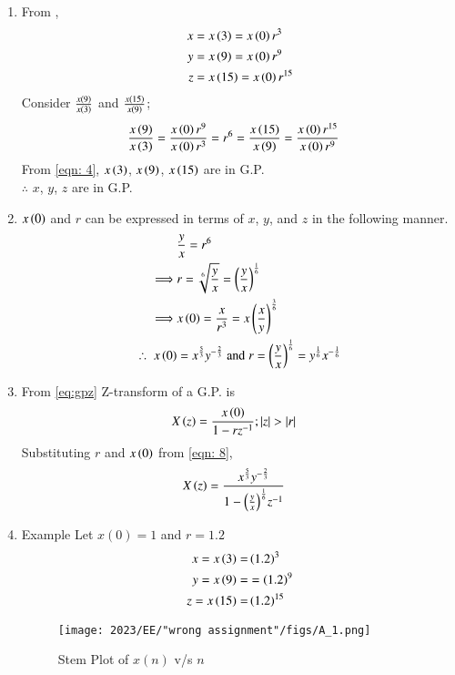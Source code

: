 \documentclass[journal,12pt,twocolumn]{IEEEtran}
\theoremstyle{remark}
\begin{document}
\begin{enumerate}
\item From ,
\begin{align}
    x&= x\left(3\right) =x\left(0\right)r^3 \\
	y&=x\left(9\right)=x\left(0\right)r^{9} \\
	z&=x\left(15\right)=x\left(0\right)r^{15}
\end{align}
Consider $\frac{x\left(9\right)}{x\left(3\right)}$ and $\frac{x\left(15\right)}{x\left(9\right)}$;
\begin{align}
	\frac{x\left(9\right)}{x\left(3\right)} &= \frac{x\left(0\right)r^{9}}{x\left(0\right)r^3} = r^6 = \frac{x\left(15\right)}{x\left(9\right)} = \frac{x\left(0\right)r^{15}}{x\left(0\right)r^{9}}\label{eqn: 4}
\end{align}
From \eqref{eqn: 4}, $x\left(3\right)$, $x\left(9\right)$, $x\left(15\right)$ are in G.P.\\
$\therefore$  $x$, $y$, $z$ are in G.P.\\

\item
$x\left(0\right)$ and $r$ can be expressed in terms of $x$, $y$, and $z$ in the following manner.
\begin{align}
    &\frac{y}{x}=r^6 \\
	\implies& r=\sqrt[6]{\frac{y}{x}}=\left(\frac{y}{x}\right)^{\frac{1}{6}}\\
    \implies& x\left(0\right)=\frac{x}{r^3} =x\left(\frac{x}{y}\right)^{\frac{3}{6}}\\
	\therefore\; x\left(0\right)&=x^{\frac{5}{3}}y^{-\frac{2}{3}}\;
	\text{and}\; r=\left(\frac{y}{x}\right)^{\frac{1}{6}}= y^{\frac{1}{6}}x^{-\frac{1}{6}} \label{eqn: 8}
\end{align}
\item 
From \eqref{eq:gpz} Z-transform of a G.P. is
\begin{align}
    X\left(z\right)&=\frac{x\left(0\right)}{1-rz^{-1}}; \left\vert z\right\vert>\left\vert r\right\vert
\end{align}
Substituting $r$ and $x\left(0\right)$ from \eqref{eqn: 8}, 
\begin{align}
     X\left(z\right)&=\frac{x^{\frac{5}{3}}y^{-\frac{2}{3}}}{1-{\left(\frac{y}{x}\right)^{\frac{1}{6}}}z^{-1}}
\end{align}
\item Example 
Let $x(0)=1$ and $r=1.2$
\begin{align}
    x=x\left(3\right)=& \left(1.2\right)^3 \\
    y=x\left(9\right)=&=\left(1.2\right)^9\\
    z=x\left(15\right)=&\left(1.2\right)^{15}
\end{align}
\begin{figure}[h]
    \renewcommand\thefigure{1}
    \centering
    \caption{Stem Plot of $x(n)$ v/s $n$}
    \texttt{[image: 2023/EE/"wrong assignment"/figs/A\_1.png]}
        \label{fig:1}
\end{figure}


\end{enumerate}
\end{document}
